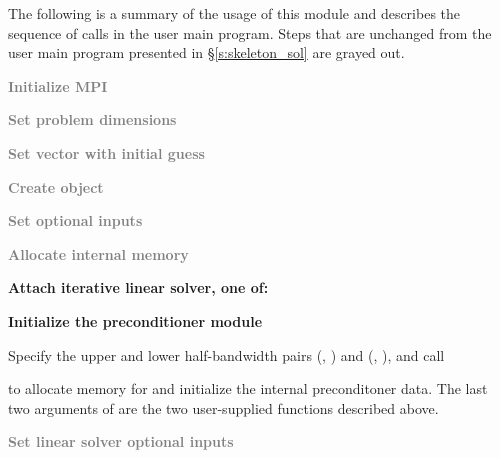 The following is a summary of the usage of this module and describes the sequence
of calls in the user main program. Steps that are unchanged from the user main
program presented in \S\ref{s:skeleton_sol} are grayed out.
\begin{Steps}
\item 
  \textcolor{gray}{\bf Initialize MPI}

\item
  \textcolor{gray}{\bf Set problem dimensions}

\item
  \textcolor{gray}{\bf Set vector with initial guess}
 
\item
  \textcolor{gray}{\bf Create {\kinsol} object}

\item
  \textcolor{gray}{\bf Set optional inputs}

\item
  \textcolor{gray}{\bf Allocate internal memory}

\item \label{i:bbdpre_attach}
  {\bf Attach iterative linear solver, one of:}






\item \label{i:bbdpre_init}
  {\bf Initialize the {\kinbbdpre} preconditioner module}

  Specify the upper and lower half-bandwidth pairs (, ) and
  (, ), and call


  to allocate memory for and initialize the internal preconditoner data.
  The last two arguments of  are the two user-supplied 
  functions described above.

\item
  \textcolor{gray}{\bf Set linear solver optional inputs}


\end{Steps}
